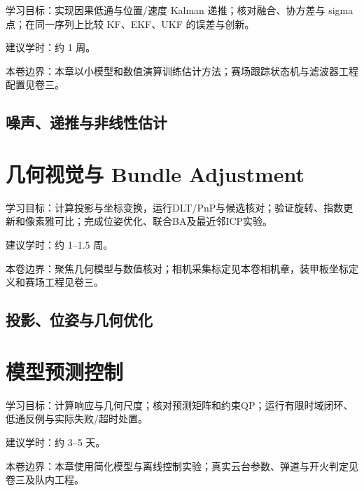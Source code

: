 \documentclass[
  lang=cn,
  scheme=chinese,
  chinesefont=ctexfont,
  11pt,
  oneside,
  device=normal,
  color=cyan,
  mode=fancy
]{elegantbook}
\begin{document}
\begin{introduction}
  \item 学习目标：实现因果低通与位置/速度 Kalman 递推；核对融合、协方差与 sigma 点；在同一序列上比较 KF、EKF、UKF 的误差与创新。
  \item 建议学时：约 1 周。
  \item 本卷边界：本章以小模型和数值演算训练估计方法；赛场跟踪状态机与滤波器工程配置见卷三。
\end{introduction}

\section{噪声、递推与非线性估计}





\chapter{几何视觉与 Bundle Adjustment}

\begin{introduction}
  \item 学习目标：计算投影与坐标变换，运行DLT/PnP与候选核对；验证旋转、指数更新和像素雅可比；完成位姿优化、联合BA及最近邻ICP实验。
  \item 建议学时：约 1--1.5 周。
  \item 本卷边界：聚焦几何模型与数值核对；相机采集标定见本卷相机章，装甲板坐标定义和赛场工程见卷三。
\end{introduction}

\section{投影、位姿与几何优化}





\chapter{模型预测控制}

\begin{introduction}
  \item 学习目标：计算响应与几何尺度；核对预测矩阵和约束QP；运行有限时域闭环、低通反例与实际失败/超时处置。
  \item 建议学时：约 3--5 天。
  \item 本卷边界：本章使用简化模型与离线控制实验；真实云台参数、弹道与开火判定见卷三及队内工程。
\end{introduction}
\end{document}
